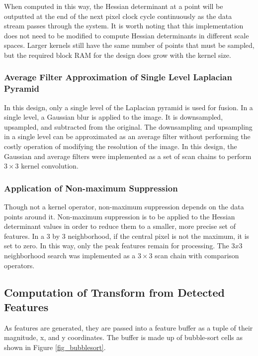 \documentclass{article}
\begin{document}
When computed in this way, the Hessian determinant at a point will be outputted at the end of the next pixel clock cycle continuously as the data stream passes through the system. It is worth noting that this implementation does not need to be modified to compute Hessian determinants in different scale spaces. Larger kernels still have the same number of points that must be sampled, but the required block RAM for the design does grow with the kernel size.

\subsubsection{Average Filter Approximation of Single Level Laplacian Pyramid}

In this design, only a single level of the Laplacian pyramid is used for fusion. In a single level, a Gaussian blur is applied to the image. It is downsampled, upsampled, and subtracted from the original. The downsampling and upsampling in a single level can be approximated as an average filter without performing the costly operation of modifying the resolution of the image. In this design, the Gaussian and average filters were implemented as a set of scan chains to perform $3 \times 3$ kernel convolution.

\subsubsection{Application of Non-maximum Suppression}

Though not a kernel operator, non-maximum suppression depends on the data points around it. Non-maximum suppression is to be applied to the Hessian determinant values in order to reduce them to a smaller, more precise set of features. In a $3$ by $3$ neighborhood, if the central pixel is not the maximum, it is set to zero. In this way, only the peak features remain for processing. The $3x3$ neighborhood search was implemented as a $3 \times 3$ scan chain with comparison operators.

\subsection{Computation of Transform from Detected Features}

As features are generated, they are passed into a feature buffer as a tuple of their magnitude, x, and y coordinates. The buffer is made up of bubble-sort cells as shown in Figure \ref{fig_bubblesort}.
\end{document}
